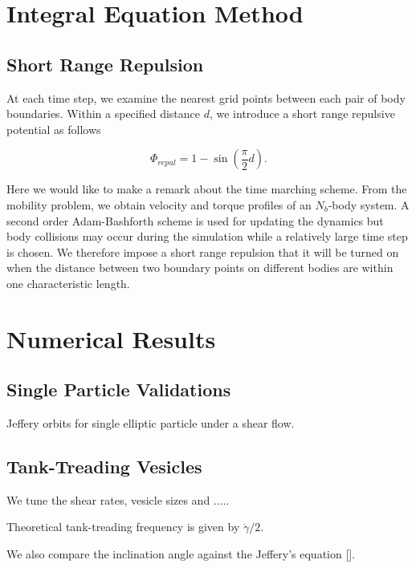 \documentclass[%
 reprint,
 amsmath,amssymb,
 aps,
]{revtex4-2}
\begin{document}
\section{\label{IEM}Integral Equation Method}



\subsection{Short Range Repulsion}

At each time step, we examine the nearest grid points between each pair of body  boundaries. Within a specified distance $d$, we introduce a short range repulsive potential as follows

\begin{equation}
\Phi_{repul} = 1- \sin\left(\frac{\pi}{2} d\right).
\end{equation}

Here we would like to make a remark about the time marching scheme. From the mobility problem, we obtain velocity and torque profiles of an $N_b$-body system. A second order Adam-Bashforth scheme is used for updating the dynamics but body collisions may occur during the simulation while a relatively large time step is chosen. We therefore impose a short range repulsion that it will be turned on when the distance between two boundary points on different bodies are within one characteristic length.


\section{\label{results}Numerical Results}

\subsection{Single Particle Validations}

Jeffery orbits for single elliptic particle under a shear flow.




\subsection{Tank-Treading Vesicles}


We tune the shear rates, vesicle sizes and .....


Theoretical tank-treading frequency is given by $\dot\gamma/2$.


We also compare the inclination angle against the Jeffery's equation [].
\end{document}

